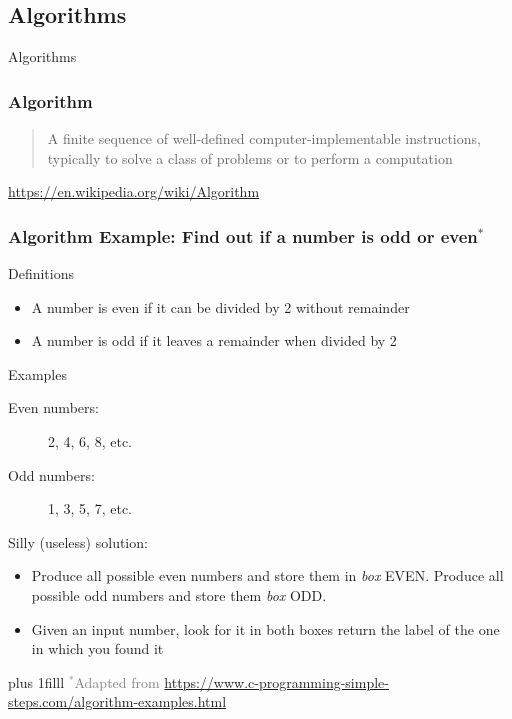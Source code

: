 \documentclass[xcolor=x11names,handout]{beamer}
\newcommand{\light}[1]{\textcolor{gray}{#1}}
\newcommand{\btVFill}{\vskip0pt plus 1filll}
\begin{document}
\begin{frame}
\section{Algorithms}
\centering
\alert{Algorithms}
\end{frame}

\begin{frame}
\frametitle{Algorithm}

\begin{quote}
A finite sequence of \alert{well-defined computer-implementable} instructions,
typically to solve a class of problems or to perform a computation
\end{quote}
\begin{flushright}
\footnotesize
 \light{\url{https://en.wikipedia.org/wiki/Algorithm}}
\end{flushright}
\end{frame}

\begin{frame}
\frametitle{Algorithm Example: Find out if a number is odd or
even$^*$}
\pause

\alert{Definitions}

\begin{itemize}
 \item A number is \alert{even} if it can be divided by 2 without remainder
 \item A number is \alert{odd} if it leaves a remainder when divided by 2
\end{itemize}				\pause

\alert{Examples}

\begin{description}
 \item[Even numbers:] 2, 4, 6, 8, etc.
 \item[Odd numbers:] 1, 3, 5, 7, etc.
\end{description}			\pause

\alert{Silly (useless) solution:}

\begin{itemize}
 \item Produce all possible even numbers and store them in \textit{box}
EVEN\@. Produce all possible odd numbers and store them \textit{box} ODD\@.
 \item Given an input number, look for it in both boxes return the label of
the one in which you found it
\end{itemize}

\btVFill
\onslide
\footnotesize
\light{$^*$Adapted from
\url{https://www.c-programming-simple-steps.com/algorithm-examples.html}}
\end{frame}
\end{document}
